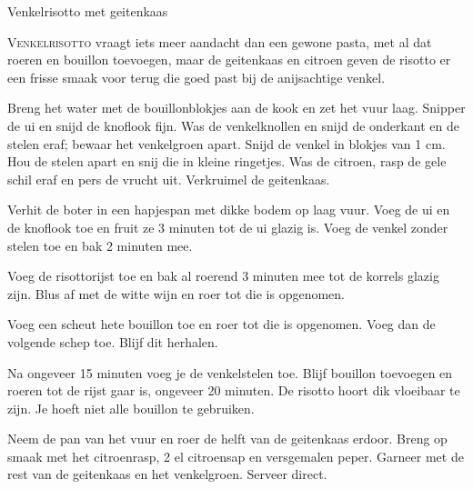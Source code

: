 \begin{recipe}{Venkelrisotto met geitenkaas}


\lettrine{V}{enkelrisotto} vraagt iets meer aandacht dan een gewone pasta, met al
dat roeren en bouillon toevoegen, maar de geitenkaas en citroen geven de risotto
er een frisse smaak voor terug die goed past bij de anijsachtige venkel.

\begin{ingredients}
\end{ingredients}

\begin{steps}
  \item Breng het water met de bouillonblokjes aan de kook en zet het vuur laag.
        Snipper de ui en snijd de knoflook fijn. Was de venkelknollen en snijd de
        onderkant en de stelen eraf; bewaar het venkelgroen apart. Snijd de venkel in blokjes
        van 1 cm. Hou de stelen apart en snij die in kleine ringetjes. Was de
        citroen, rasp de gele schil eraf en pers de vrucht uit. Verkruimel de
        geitenkaas.
  \item Verhit de boter in een hapjespan met dikke bodem op laag vuur. Voeg de ui en de
        knoflook toe en fruit ze 3 minuten tot de ui glazig is. Voeg de venkel zonder stelen
        toe en bak 2 minuten mee.
  \item Voeg de risottorijst toe en bak al roerend 3 minuten mee tot de korrels glazig
        zijn. Blus af met de witte wijn en roer tot die is opgenomen.
  \item Voeg een scheut hete bouillon toe en roer tot die is opgenomen. Voeg dan de volgende
        schep toe. Blijf dit herhalen.
  \item Na ongeveer 15 minuten voeg je de venkelstelen toe. Blijf bouillon toevoegen en roeren
        tot de rijst gaar is, ongeveer 20 minuten. De risotto hoort dik vloeibaar te
        zijn. Je hoeft niet alle bouillon te gebruiken.
  \item Neem de pan van het vuur en roer de helft van de geitenkaas erdoor. Breng op
        smaak met het citroenrasp, 2 el citroensap en versgemalen peper. Garneer
        met de rest van de geitenkaas en het venkelgroen. Serveer direct.
\end{steps}
\end{recipe}

